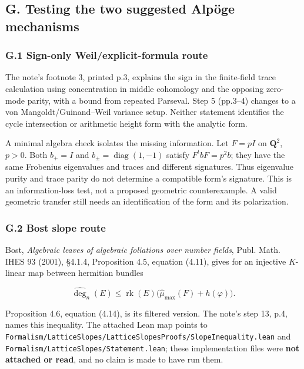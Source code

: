\subsection{G. Testing the two suggested Alpöge
mechanisms}\label{g.-testing-the-two-suggested-alpuxf6ge-mechanisms}

\subsubsection{G.1 Sign-only Weil/explicit-formula
route}\label{g.1-sign-only-weilexplicit-formula-route}

The note's footnote 3, printed p.3, explains the sign in the
finite-field trace calculation using concentration in middle cohomology
and the opposing zero-mode parity, with a bound from repeated Parseval.
Step 5 (pp.3--4) changes to a von Mangoldt/Guinand--Weil variance setup.
Neither statement identifies the cycle intersection or arithmetic height
form with the analytic form.

A minimal algebra check isolates the missing information. Let \(F=pI\)
on \(\mathbf Q^2\), \(p>0\). Both \(b_+=I\) and
\(b_\pm=\operatorname{diag}(1,-1)\) satisfy \(F^tbF=p^2b\); they have
the same Frobenius eigenvalues and traces and different signatures. Thus
eigenvalue purity and trace parity do not determine a compatible form's
signature. This is an information-loss test, not a proposed geometric
counterexample. A valid geometric transfer still needs an identification
of the form and its polarization.

\subsubsection{G.2 Bost slope route}\label{g.2-bost-slope-route}

Bost, \emph{Algebraic leaves of algebraic foliations over number
fields}, Publ. Math. IHES 93 (2001), §4.1.4, Proposition 4.5, equation
(4.11), gives for an injective \(K\)-linear map between hermitian
bundles

\[
\widehat{\deg}_{n}(E)
\le\operatorname{rk}(E)\bigl(\widehat\mu_{\max}(F)+h(\varphi)\bigr).
\tag{AR.7}
\]

Proposition 4.6, equation (4.14), is its filtered version. The note's
step 13, p.4, names this inequality. The attached Lean map points to
\texttt{Formalism/LatticeSlopes/LatticeSlopesProofs/SlopeInequality.lean}
and \texttt{Formalism/LatticeSlopes/Statement.lean}; these
implementation files were \textbf{not attached or read}, and no claim is
made to have run them.

